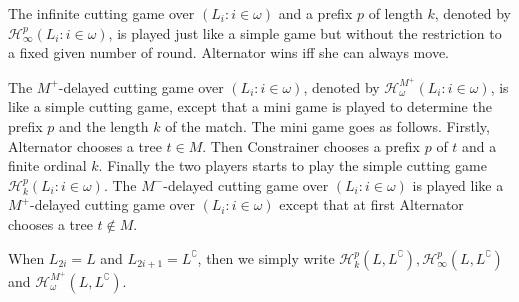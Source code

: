 The infinite cutting game over $( L_i : i \in \omega )$ and a prefix $p$ of length $k$, denoted by $\mathcal{H}^p_\infty(L_i : i \in \omega )$, is played just like a simple game but without the restriction to a fixed given number of round. Alternator wins iff she can always move.

The $M^+$-delayed cutting game over $( L_i : i \in \omega )$, denoted by $\mathcal{H}^{M^+}_\omega(L_i : i \in \omega )$, is like a simple cutting game, except that a mini game is played to determine the prefix $p$ and the length $k$ of the match. 
The mini game goes as follows. Firstly, Alternator chooses a tree $t \in M$. Then Constrainer chooses a prefix $p$ of $t$ and a finite ordinal $k$. Finally the two players starts to play the simple cutting game $\mathcal{H}^p_k(L_i : i \in \omega )$. 
The $M^-$-delayed cutting game over $( L_i : i \in \omega )$ is played like a $M^+$-delayed cutting game over $( L_i : i \in \omega )$ except that at first Alternator chooses a tree $t \notin M$.

When $L_{2i}=L$ and $L_{2i +1}=L^\complement$, then we simply write $\mathcal{H}^p_k(L, L^\complement), \mathcal{H}^p_\infty(L, L^\complement)$ and  $\mathcal{H}^{M^+}_\omega(L, L^\complement)$.

